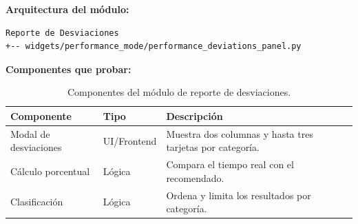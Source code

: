 \documentclass[11pt]{article}
\begin{document}
\textbf{Arquitectura del módulo:}
\begin{verbatim}
Reporte de Desviaciones
+-- widgets/performance_mode/performance_deviations_panel.py
\end{verbatim}

\textbf{Componentes que probar:}
\begin{table}[H]
\centering
\begin{tabular}{|L{0.30\textwidth}|L{0.16\textwidth}|L{0.44\textwidth}|}
\hline
\textbf{Componente} & \textbf{Tipo} & \textbf{Descripción} \\ \hline
Modal de desviaciones & UI/Frontend & Muestra dos columnas y hasta tres tarjetas por categoría. \\ \hline
Cálculo porcentual & Lógica & Compara el tiempo real con el recomendado. \\ \hline
Clasificación & Lógica & Ordena y limita los resultados por categoría. \\ \hline
\end{tabular}
\caption{Componentes del módulo de reporte de desviaciones.}
\label{tab:componentes-modulo-desviaciones}
\end{table}
\end{document}

